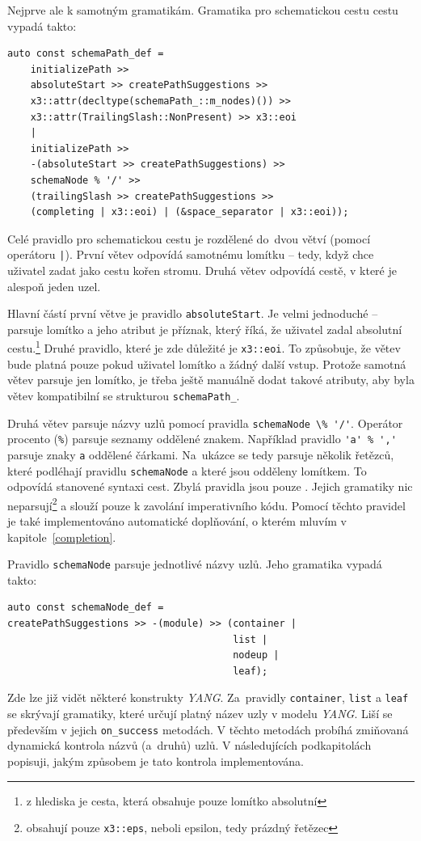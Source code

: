 \documentclass[thesis=B,czech,hidelinks]{FITthesis}[2019/03/06]
\begin{document}
Nejprve ale k samotným gramatikám. Gramatika pro schematickou cestu cestu vypadá takto:
\begin{verbatim}
auto const schemaPath_def =
    initializePath >>
    absoluteStart >> createPathSuggestions >>
    x3::attr(decltype(schemaPath_::m_nodes)()) >>
    x3::attr(TrailingSlash::NonPresent) >> x3::eoi
    |
    initializePath >>
    -(absoluteStart >> createPathSuggestions) >>
    schemaNode % '/' >>
    (trailingSlash >> createPathSuggestions >>
    (completing | x3::eoi) | (&space_separator | x3::eoi));
\end{verbatim}
Celé pravidlo pro schematickou cestu je rozdělené do~dvou větví (pomocí operátoru \texttt{|}). První větev odpovídá samotnému lomítku -- tedy, když chce uživatel zadat jako cestu kořen stromu. Druhá větev odpovídá cestě, v které je alespoň jeden uzel.

Hlavní částí první větve je pravidlo \texttt{absoluteStart}. Je velmi jednoduché -- parsuje lomítko a jeho atribut je příznak, který říká, že uživatel zadal absolutní cestu.\footnote{z hlediska  je cesta, která obsahuje pouze lomítko absolutní} Druhé pravidlo, které je zde důležité je \texttt{x3::eoi}. To způsobuje, že větev bude platná pouze pokud uživatel lomítko a žádný další vstup. Protože samotná větev parsuje jen lomítko, je třeba ještě manuálně dodat takové atributy, aby byla větev kompatibilní se strukturou \texttt{schemaPath\_}.

Druhá větev parsuje názvy uzlů pomocí pravidla \verb¨schemaNode \% '/'¨. Operátor procento (\texttt{\%}) parsuje seznamy oddělené znakem. Například pravidlo \verb¨'a' % ','¨ parsuje znaky \texttt{a} oddělené čárkami. Na~ukázce se tedy parsuje několik řetězců, které podléhají pravidlu \texttt{schemaNode} a které jsou odděleny lomítkem. To odpovídá stanovené syntaxi cest. Zbylá pravidla jsou pouze . Jejich gramatiky nic neparsují\footnote{obsahují pouze \texttt{x3::eps}, neboli epsilon, tedy prázdný řetězec} a slouží pouze k zavolání imperativního kódu. Pomocí těchto pravidel je také implementováno automatické doplňování, o kterém mluvím v kapitole~\ref{completion}.

Pravidlo \texttt{schemaNode} parsuje jednotlivé názvy uzlů. Jeho gramatika vypadá takto:
\begin{verbatim}
auto const schemaNode_def =
createPathSuggestions >> -(module) >> (container |
                                       list |
                                       nodeup |
                                       leaf);
\end{verbatim}
Zde lze již vidět některé konstrukty \textit{YANG}. Za~pravidly \texttt{container}, \texttt{list} a \texttt{leaf} se skrývají gramatiky, které určují platný název uzly v modelu \textit{YANG}. Liší se především v jejich \verb¨on_success¨ metodách. V těchto metodách probíhá zmiňovaná dynamická kontrola názvů (a~druhů) uzlů. V následujících podkapitolách popisuji, jakým způsobem je tato kontrola implementována.
\end{document}
